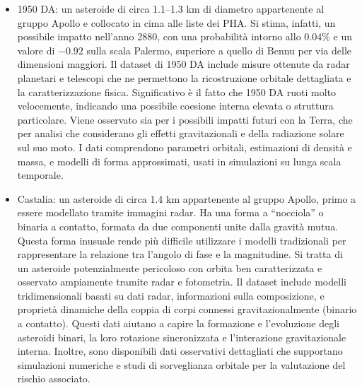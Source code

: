 \documentclass[12pt,a4paper,openright,twoside]{book}
\begin{document}
\begin{itemize}
\item 1950 DA: un asteroide di circa 1.1--1.3 km di diametro appartenente al gruppo Apollo e collocato in cima alle liste dei PHA. Si stima, infatti, un possibile impatto nell'anno 2880, con una probabilità intorno allo $0.04\%$ e un valore di $-0.92$ sulla scala Palermo, superiore a quello di Bennu per via delle dimensioni maggiori. Il dataset di 1950 DA include misure ottenute da radar planetari e telescopi che ne permettono la ricostruzione orbitale dettagliata e la caratterizzazione fisica. Significativo è il fatto che 1950 DA ruoti molto velocemente, indicando una possibile coesione interna elevata o struttura particolare. Viene osservato sia per i possibili impatti futuri con la Terra, che per analisi che considerano gli effetti gravitazionali e della radiazione solare sul suo moto. I dati comprendono parametri orbitali, estimazioni di densità e massa, e modelli di forma approssimati, usati in simulazioni su lunga scala temporale.

\item Castalia: un asteroide di circa 1.4 km appartenente al gruppo Apollo, primo a essere modellato tramite immagini radar. Ha una forma a ``nocciola'' o binaria a contatto, formata da due componenti unite dalla gravità mutua. Questa forma inusuale rende più difficile utilizzare i modelli tradizionali per rappresentare la relazione tra l'angolo di fase e la magnitudine. Si tratta di un asteroide potenzialmente pericoloso con orbita ben caratterizzata e osservato ampiamente tramite radar e fotometria. Il dataset include modelli tridimensionali basati su dati radar, informazioni sulla composizione, e proprietà dinamiche della coppia di corpi connessi gravitazionalmente (binario a contatto). Questi dati aiutano a capire la formazione e l'evoluzione degli asteroidi binari, la loro rotazione sincronizzata e l'interazione gravitazionale interna. Inoltre, sono disponibili dati osservativi dettagliati che supportano simulazioni numeriche e studi di sorveglianza orbitale per la valutazione del rischio associato.
\end{itemize}
\end{document}
